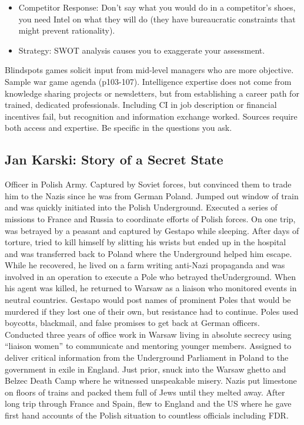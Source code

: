 \documentclass[
]{article}
\begin{document}
\begin{itemize}
\item
  Competitor Response: Don't say what you would do in a competitor's
  shoes, you need Intel on what they will do (they have bureaucratic
  constraints that might prevent rationality).
\item
  Strategy: SWOT analysis causes you to exaggerate your assessment.
\end{itemize}

Blindspots games solicit input from mid-level managers who are more
objective. Sample war game agenda (p103-107). Intelligence expertise
does not come from knowledge sharing projects or newsletters, but from
establishing a career path for trained, dedicated professionals.
Including CI in job description or financial incentives fail, but
recognition and information exchange worked. Sources require both access
and expertise. Be specific in the questions you ask.

\hypertarget{jan-karski-story-of-a-secret-state}{%
\subsection{Jan Karski: Story of a Secret
State}\label{jan-karski-story-of-a-secret-state}}

Officer in Polish Army. Captured by Soviet forces, but convinced them to
trade him to the Nazis since he was from German Poland. Jumped out
window of train and was quickly initiated into the Polish Underground.
Executed a series of missions to France and Russia to coordinate efforts
of Polish forces. On one trip, was betrayed by a peasant and captured by
Gestapo while sleeping. After days of torture, tried to kill himself by
slitting his wrists but ended up in the hospital and was transferred
back to Poland where the Underground helped him escape. While he
recovered, he lived on a farm writing anti-Nazi propaganda and was
involved in an operation to execute a Pole who betrayed theUnderground.
When his agent was killed, he returned to Warsaw as a liaison who
monitored events in neutral countries. Gestapo would post names of
prominent Poles that would be murdered if they lost one of their own,
but resistance had to continue. Poles used boycotts, blackmail, and
false promises to get back at German officers. Conducted three years of
office work in Warsaw living in absolute secrecy using ``liaison women''
to communicate and mentoring younger members. Assigned to deliver
critical information from the Underground Parliament in Poland to the
government in exile in England. Just prior, snuck into the Warsaw ghetto
and Belzec Death Camp where he witnessed unspeakable misery. Nazis put
limestone on floors of trains and packed them full of Jews until they
melted away. After long trip through France and Spain, flew to England
and the US where he gave first hand accounts of the Polish situation to
countless officials including FDR.
\end{document}

